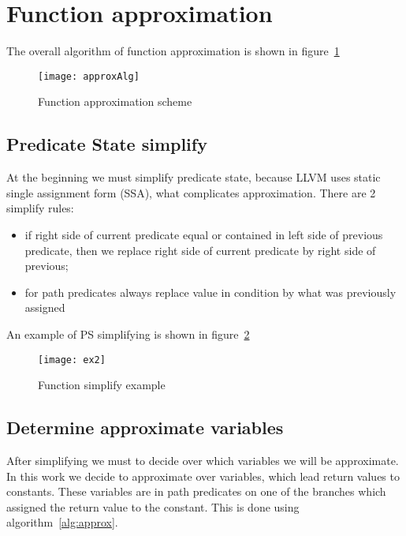 \section{Function approximation}\label{sec:mining}

The overall algorithm of function approximation is shown in figure~\ref{fig:approxAlg}
\begin{figure}[H]
\centering
\caption{Function approximation scheme}
\label{fig:approxAlg}
\texttt{[image: approxAlg]}
\end{figure}


\subsection{Predicate State simplify}
At the beginning we must simplify predicate state, because LLVM uses static single assignment form (SSA), what complicates approximation. There are 2 simplify rules:
\begin{itemize}
\item if right side of current predicate equal or contained in left side of previous predicate, then we replace right side of current predicate by right side of previous;
\item for path predicates always replace value in condition by what was previously assigned
\end{itemize} 
An example of PS simplifying is shown in figure~\ref{fig:simEx}

\begin{figure}[tbh]
\centering
\caption{Function simplify example}
\label{fig:simEx}
\texttt{[image: ex2]}
\end{figure}

\subsection{Determine approximate variables}
After simplifying we must to decide over which variables we will be approximate. In this work we decide to approximate over variables, which lead return values to constants. These variables are in path predicates on one of the branches which assigned the return value to the constant. This is done using algorithm~\ref{alg:approx}.

